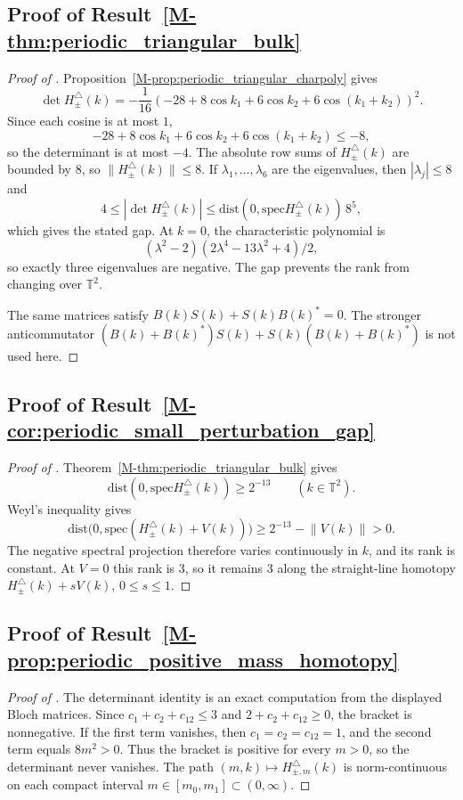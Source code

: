 \documentclass[11pt]{article}
\numberwithin{equation}{section}
\theoremstyle{definition}
\theoremstyle{remark}
\newcommand{\spec}{\mathrm{spec}}
\newcommand{\dist}{\mathrm{dist}}
\newcommand{\opnorm}[1]{\left\lVert#1\right\rVert}
\begin{document}
\subsection{Proof of Result~\ref{M-thm:periodic_triangular_bulk}}\label{app:proof:thm:periodic_triangular_bulk}
\begin{proof}[Proof of ]
Proposition~\ref{M-prop:periodic_triangular_charpoly} gives
\[
\det H_\pm^\triangle(k)
=
-\frac1{16}
\left(
-28+8\cos k_1+6\cos k_2+6\cos(k_1+k_2)
\right)^2.
\]
Since each cosine is at most \(1\),
\[
-28+8\cos k_1+6\cos k_2+6\cos(k_1+k_2)\le -8,
\]
so the determinant is at most \(-4\). The absolute row sums of \(H_\pm^\triangle(k)\) are bounded
by \(8\), so \(\|H_\pm^\triangle(k)\|\le8\). If \(\lambda_1,\ldots,\lambda_6\) are the eigenvalues,
then \(|\lambda_j|\le8\) and
\[
4\le|\det H_\pm^\triangle(k)|
\le
\dist(0,\spec H_\pm^\triangle(k))\,8^5,
\]
which gives the stated gap. At \(k=0\), the characteristic polynomial is
\[
(\lambda^2-2)(2\lambda^4-13\lambda^2+4)/2,
\]
so exactly three eigenvalues are negative. The gap prevents the rank from changing over
\(\mathbb T^2\).

The same matrices satisfy \(B(k)S(k)+S(k)B(k)^*=0\). The stronger anticommutator
\((B(k)+B(k)^*)S(k)+S(k)(B(k)+B(k)^*)\) is not used here.
\end{proof}

\subsection{Proof of Result~\ref{M-cor:periodic_small_perturbation_gap}}\label{app:proof:cor:periodic_small_perturbation_gap}
\begin{proof}[Proof of ]
Theorem~\ref{M-thm:periodic_triangular_bulk} gives
\[
\dist(0,\spec H_\pm^\triangle(k))\ge 2^{-13}
\qquad(k\in\mathbb T^2).
\]
Weyl's inequality gives
\[
\dist\bigl(0,\spec(H_\pm^\triangle(k)+V(k))\bigr)
\ge
2^{-13}-\opnorm{V(k)}>0.
\]
The negative spectral projection therefore varies continuously in \(k\), and its rank is constant.
At \(V=0\) this rank is \(3\), so it remains \(3\) along the straight-line homotopy
\(H_\pm^\triangle(k)+sV(k)\), \(0\le s\le1\).
\end{proof}

\subsection{Proof of Result~\ref{M-prop:periodic_positive_mass_homotopy}}\label{app:proof:prop:periodic_positive_mass_homotopy}
\begin{proof}[Proof of ]
The determinant identity is an exact computation from the displayed Bloch matrices. Since
\(c_1+c_2+c_{12}\le3\) and \(2+c_2+c_{12}\ge0\), the bracket is nonnegative. If the first term
vanishes, then \(c_1=c_2=c_{12}=1\), and the second term equals \(8m^2>0\). Thus the bracket is
positive for every \(m>0\), so the determinant never vanishes. The path
\((m,k)\mapsto H_{\pm,m}^\triangle(k)\) is norm-continuous on each compact interval
\(m\in[m_0,m_1]\subset(0,\infty)\).
\end{proof}
\end{document}
